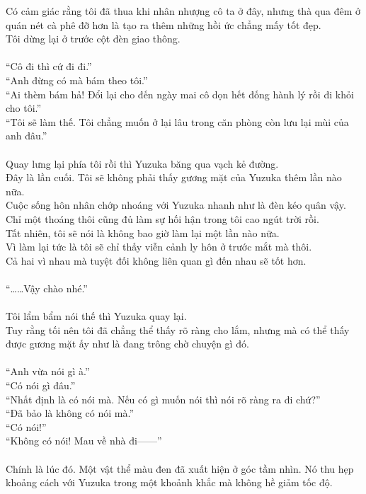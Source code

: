 \documentclass[12pt,a4paper, twosides]{book}
\begin{document}
Có cảm giác rằng tôi đã thua khi nhân nhượng cô ta ở đây, nhưng thà qua đêm ở quán nét cà phê đỡ hơn là tạo ra thêm những hồi ức chẳng mấy tốt đẹp.\\
Tôi dừng lại ở trước cột đèn giao thông.\\
\\
“Cô đi thì cứ đi đi.”\\
“Anh đừng có mà bám theo tôi.”\\
“Ai thèm bám hả! Đổi lại cho đến ngày mai cô dọn hết đống hành lý rồi đi khỏi cho tôi.”\\
“Tôi sẽ làm thế. Tôi chẳng muốn ở lại lâu trong căn phòng còn lưu lại mùi của anh đâu.”\\
\\
Quay lưng lại phía tôi rồi thì Yuzuka băng qua vạch kẻ đường.\\
Đây là lần cuối. Tôi sẽ không phải thấy gương mặt của Yuzuka thêm lần nào nữa.\\
Cuộc sống hôn nhân chớp nhoáng với Yuzuka nhanh như là đèn kéo quân vậy. Chỉ một thoáng thôi cũng đủ làm sự hối hận trong tôi cao ngút trời rồi.\\
Tất nhiên, tôi sẽ nói là không bao giờ làm lại một lần nào nữa.\\
Vì làm lại tức là tôi sẽ chỉ thấy viễn cảnh ly hôn ở trước mắt mà thôi.\\
Cả hai vì nhau mà tuyệt đối không liên quan gì đến nhau sẽ tốt hơn.\\
\\
“……Vậy chào nhé.”\\
\\
Tôi lẩm bẩm nói thế thì Yuzuka quay lại.\\
Tuy rằng tối nên tôi đã chẳng thể thấy rõ ràng cho lắm, nhưng mà có thể thấy được gương mặt ấy như là đang trông chờ chuyện gì đó.\\
\\
“Anh vừa nói gì à.”\\
“Có nói gì đâu.”\\
“Nhất định là có nói mà. Nếu có gì muốn nói thì nói rõ ràng ra đi chứ?”\\
“Đã bảo là không có nói mà.”\\
“Có nói!”\\
“Không có nói! Mau về nhà đi——”\\
\\
Chính là lúc đó. Một vật thể màu đen đã xuất hiện ở góc tầm nhìn. Nó thu hẹp khoảng cách với Yuzuka trong một khoảnh khắc mà không hề giảm tốc độ.\\
\end{document}
